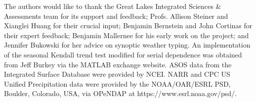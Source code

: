 \documentclass[twocol]{ametsoc}
\begin{document}



%
\acknowledgments
The authors would like to thank the Great Lakes Integrated Sciences \& Assessments team for its support and feedback; Profs. Allison Steiner and Xianglei Huang for their crucial input; Benjamin Bernstein and John Cortinas for their expert feedback; Benjamin Mallernee for his early work on the project; and Jennifer Bukowski for her advice on synoptic weather typing. An implementation of the seasonal Kendall trend test modified for serial dependence was obtained from Jeff Burkey via the MATLAB exchange website. ASOS data from the Integrated Surface Database were provided by NCEI. NARR and CPC US Unified Precipitation data were provided by the NOAA/OAR/ESRL PSD, Boulder, Colorado, USA, via OPeNDAP at https://www.esrl.noaa.gov/psd/.  



\end{document}

